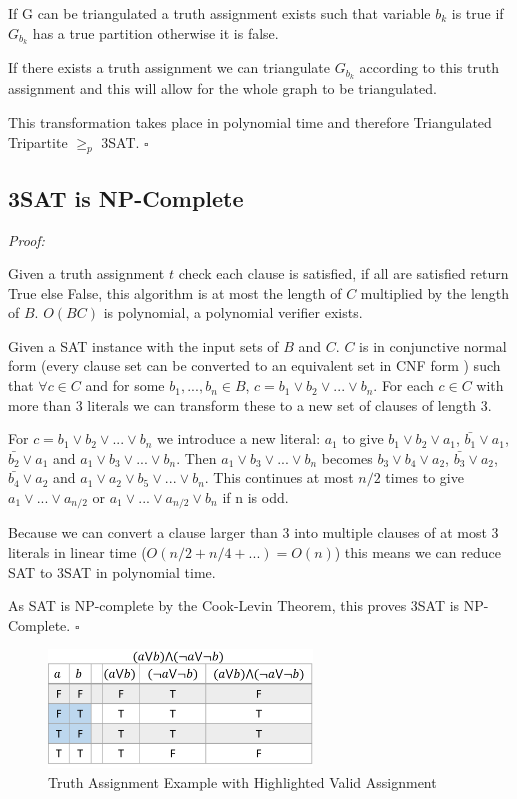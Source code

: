 \documentclass[a4paper,11pt]{report}
\begin{document}
If G can be triangulated a truth assignment exists such that variable $b_k$ is true if $G_{b_k}$ has a true partition otherwise it is false.

If there exists a truth assignment we can triangulate $G_{b_k}$ according to this truth assignment and this will allow for the whole graph to be triangulated.

This transformation takes place in polynomial time and therefore Triangulated Tripartite $\geq_p$ 3SAT. $\square$


\subsection{3SAT is NP-Complete}

\textit{Proof:}

Given a truth assignment $t$ check each clause is satisfied, if all are satisfied return True else False, this algorithm is at most the length of $C$ multiplied by the length of $B$. $O(BC)$ is polynomial, a polynomial verifier exists.

Given a SAT instance with the input sets of $B$ and $C$. $C$ is in conjunctive normal form (every clause set can be converted to an equivalent set in CNF form ) such that $\forall c \in C$ and for some $b_1, ... ,b_n \in B$, $c = b_1 \lor b_2
\lor ... \lor b_n$. For each $c \in C$ with more than 3 literals we can transform these to a new set of clauses of length 3.

For $c = b_1 \lor b_2 \lor ... \lor b_n$ we introduce a new literal: $a_1$ to give $b_1 \lor b_2 \lor a_1$, $\bar{b_1} \lor a_1$, $\bar{b_2} \lor a_1$ and $a_1 \lor b_3 \lor ... \lor b_n$. Then $a_1 \lor b_3 \lor ... \lor b_n$ becomes $b_3 \lor b_4 \lor a_2$, $\bar{b_3} \lor a_2$, $\bar{b_4} \lor a_2$ and $a_1 \lor a_2 \lor b_5 \lor ... \lor b_n$. This continues at most $n/2$ times to give $a_1 \lor ... \lor a_{n/2}$ or $a_1 \lor ... \lor a_{n/2} \lor b_n$ if n is odd.

Because we can convert a clause larger than 3 into multiple clauses of at most 3 literals in linear time ($O(n/2 + n/4 + ...) = O(n)$) this means we can reduce SAT to 3SAT in polynomial time.

As SAT is NP-complete by the Cook-Levin Theorem, this proves 3SAT is NP-Complete. $\square$
		
\begin{figure}
\begin{center}
		\includegraphics[width=70mm]{figures/sat_example.png}
\end{center}
		\caption{Truth Assignment Example with Highlighted Valid Assignment}
\end{figure}
\end{document}
